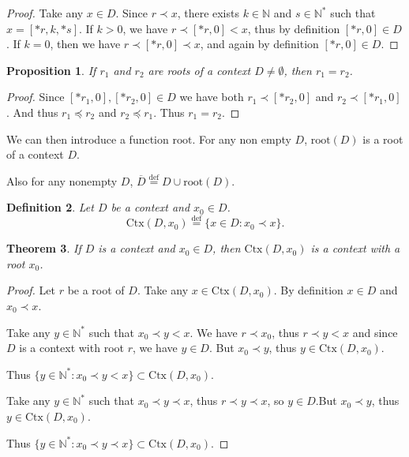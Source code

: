 \documentclass[10pt]{article}
\theoremstyle{plain}
\newtheorem{theorem}{Theorem}[section]
\newtheorem{proposition}[theorem]{Proposition}
\newtheorem{definition}[theorem]{Definition}
\newcommand{\defeq}{\stackrel{\mathrm{def}}{=}}
\newcommand{\N}{\mathbb{N}}
\renewcommand{\root}{\text{root}}
\newcommand{\context}{\text{Ctx}}
\begin{document}
\begin{proof}
Take any $x\in D$. Since $r \prec x$, there exists $k\in\N$ and $s\in\N^*$ such that
$x = [*r, k, *s]$. If $k > 0$, we have $r \prec [*r, 0] < x$, thus by definition $[*r, 0]\in D$. If $k = 0$, then we have $r \prec [*r, 0] \prec x$, and again by definition $[*r, 0]\in D$.
\end{proof}

\begin{proposition}
If $r_1$ and $r_2$ are roots of a context $D\not=\emptyset$, then $r_1 = r_2$. 
\end{proposition}
\begin{proof}
Since $[*r_1, 0], [*r_2, 0]\in D$ we have both $r_1 \prec [*r_2, 0]$ and
$r_2 \prec [*r_1, 0]$. And thus $r_1 \preceq r_2$ and $r_2 \preceq r_1$. Thus $r_1 = r_2$.
\end{proof} 

We can then introduce a function $\root$. For any non empty $D$, $\root(D)$ is a root of a context $D$.

Also for any nonempty $D$, $\overline{D} \defeq D \cup \root(D)$.

\begin{definition}
Let $D$ be a context and $x_0\in D$.
\begin{equation}
\context(D,x_0) \defeq \{ x\in D: x_0 \prec x\}.
\end{equation}
\end{definition}

\begin{theorem}
If $D$ is a context and $x_0\in D$, then $\context(D,x_0)$ is a context with a root $x_0$.
\end{theorem}
\begin{proof}
Let $r$ be a root of $D$.
Take any $x \in \context(D,x_0)$. By definition $x\in D$ and $x_0 \prec x$.

Take any $y\in \N^*$ such that $x_0 \prec y < x$. We have $r \prec x_0$, thus $r \prec y < x$ and since $D$ is a context with root $r$, we have $y\in D$. But $x_0\prec y$, thus $y\in \context(D,x_0)$.

Thus $\{y \in \N^*: x_0 \prec y < x \} \subset \context(D,x_0)$.

Take any $y \in \N^*$ such that $x_0 \prec y \prec x$, thus $r \prec y \prec x$, so $y\in D$.But $x_0\prec y$, thus $y\in \context(D,x_0)$.

Thus $\{y \in \N^*: x_0 \prec y \prec x \} \subset \context(D,x_0)$.
\end{proof}
\end{document}
